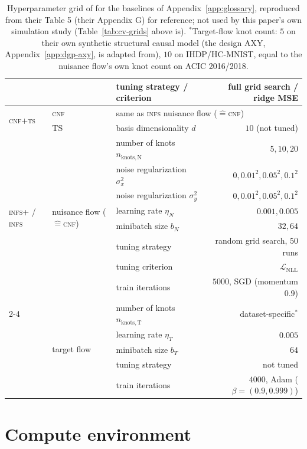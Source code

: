 \documentclass[11pt]{article}
\theoremstyle{plain}
\theoremstyle{definition}
\theoremstyle{remark}
\begin{document}
\begin{table}[p]
\begin{tabular}{@{}lllr@{}}
 & & tuning strategy / criterion & full grid search / ridge MSE \\
\midrule
\multirow{2}{*}{\textsc{cnf+ts}} & \textsc{cnf} & \multicolumn{2}{l}{same as \textsc{infs} nuisance flow ($\hat=$\textsc{cnf})} \\
 & TS & basis dimensionality $d$ & $10$ (not tuned) \\
\midrule
\multirow{8}{*}{\parbox{2.2cm}{\raggedright \textsc{infs+} / \textsc{infs}}}
 & \multirow{8}{*}{\parbox{1.6cm}{\raggedright nuisance flow ($\hat=$\textsc{cnf})}}
 & number of knots $n_{\mathrm{knots,N}}$ & $5,10,20$ \\
 & & noise regularization $\sigma_x^2$ & $0,0.01^2,0.05^2,0.1^2$ \\
 & & noise regularization $\sigma_y^2$ & $0,0.01^2,0.05^2,0.1^2$ \\
 & & learning rate $\eta_N$ & $0.001,0.005$ \\
 & & minibatch size $b_N$ & $32,64$ \\
 & & tuning strategy & random grid search, $50$ runs \\
 & & tuning criterion & $\mathcal{L}_{\mathrm{NLL}}$ \\
 & & train iterations & $5000$, SGD (momentum $0.9$) \\
\cmidrule(l){2-4}
 & \multirow{5}{*}{target flow}
 & number of knots $n_{\mathrm{knots,T}}$ & dataset-specific$^*$ \\
 & & learning rate $\eta_T$ & $0.005$ \\
 & & minibatch size $b_T$ & $64$ \\
 & & tuning strategy & not tuned \\
 & & train iterations & $4000$, Adam ($\beta{=}(0.9,0.999)$) \\
\bottomrule
\end{tabular}
\caption{Hyperparameter grid of \citet{melnychuk2023flows} for the baselines of
Appendix~\ref{app:glossary}, reproduced from their Table 5 (their Appendix G) for reference; not
used by this paper's own simulation study (Table~\ref{tab:cv-grids} above is). $^*$Target-flow
knot count: $5$ on their own synthetic structural causal model (the design AXY, Appendix~\ref{app:dgp-axy}, is
adapted from), $10$ on IHDP/HC-MNIST, equal to the nuisance flow's own knot count on
ACIC 2016/2018.}
\label{tab:baseline-grids}
\end{table}

\section{Compute environment}
\label{app:compute}
\end{document}
